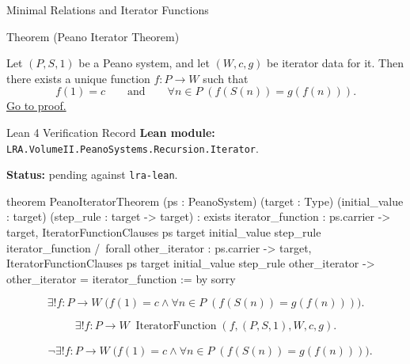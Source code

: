 \begin{topicbox}{Minimal Relations and Iterator Functions}
\begin{theorembox}{Theorem (Peano Iterator Theorem)}
\begin{theorem}
\label{thm:peano-iterator-theorem}
Let $(P,S,1)$ be a Peano system, and let $(W,c,g)$ be iterator data for it.
Then there exists a unique function $f:P\to W$ such that
\[
f(1)=c
\qquad\text{and}\qquad
\forall n\in P\;(f(S(n))=g(f(n))).
\]
\hyperref[prf:peano-iterator-theorem]{Go to proof.}
\end{theorem}
\end{theorembox}

\begin{formalizationrecord}{Lean 4 Verification Record}
\textbf{Lean module:} \texttt{LRA.VolumeII.PeanoSystems.Recursion.Iterator}.\par
{}
\textbf{Status:} pending against \texttt{lra-lean}.\par

\begin{leancode}
theorem PeanoIteratorTheorem
    (ps : PeanoSystem)
    (target : Type)
    (initial_value : target)
    (step_rule : target -> target) :
    exists iterator_function : ps.carrier -> target,
      IteratorFunctionClauses
        ps
        target
        initial_value
        step_rule
        iterator_function /\
      forall other_iterator : ps.carrier -> target,
        IteratorFunctionClauses
          ps
          target
          initial_value
          step_rule
          other_iterator ->
        other_iterator = iterator_function := by
  sorry
\end{leancode}
\end{formalizationrecord}

\begin{remark*}
\[
\exists! f:P\to W\;
\bigl(f(1)=c\land \forall n\in P\;(f(S(n))=g(f(n)))\bigr).
\]
\end{remark*}

\begin{remark*}
\[
\exists! f:P\to W\;
\operatorname{IteratorFunction}(f,(P,S,1),W,c,g).
\]
\end{remark*}

\begin{remark*}
\[
\begin{aligned}
&\neg\exists! f:P\to W\;
\bigl(f(1)=c\land \forall n\in P\;(f(S(n))=g(f(n)))\bigr).
\end{aligned}
\]
\end{remark*}


\end{topicbox}
